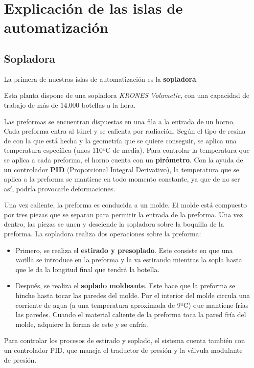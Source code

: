 \documentclass[11pt,a4paper,spanish,twoside]{report}
\begin{document}
\chapter{Explicación de las islas de automatización}
\section{Sopladora}
La primera de nuestras islas de automatización es la \textbf{sopladora}.

Esta planta dispone de una sopladora \emph{KRONES Volumetic}, con una 
capacidad de trabajo de más de 14.000 botellas a la hora.

Las preformas se encuentran dispuestas en una fila a la entrada de un horno. 
Cada preforma entra al túnel y se calienta por radiación. Según el tipo de 
resina de con la que está hecha y la geometría que se quiere conseguir, se 
aplica una temperatura específica (unos 110ºC de media). Para controlar la 
temperatura que se aplica a cada preforma, el horno cuenta con un 
\textbf{pirómetro}. Con la ayuda de un controlador \textbf{PID} (Proporcional
Integral Derivativo), la temperatura que se aplica a la preforma se mantiene
en todo momento constante, ya que de no ser así, podría provocarle
deformaciones.

Una vez caliente, la preforma es conducida a un molde. El molde está compuesto
por tres piezas que se separan para permitir la entrada de la preforma. 
Una vez dentro, las piezas se unen y desciende la sopladora sobre la boquilla 
de la preforma. La sopladora realiza dos operaciones sobre la preforma:
\begin{itemize}
\item Primero, se realiza el \textbf{estirado y presoplado}. Este consiste en
que una varilla se introduce en la preforma y la va estirando mientras la 
sopla hasta que le da la longitud final que tendrá la botella.
\item Después, se realiza el \textbf{soplado moldeante}. Este hace que la 
preforma se hinche hasta tocar las paredes del molde. Por el interior del
molde circula una corriente de agua (a una temperatura aproximada de 9ºC) que
mantiene frías las paredes. Cuando el material caliente de la preforma toca la
pared fría del molde, adquiere la forma de este y se enfría.
\end{itemize}
Para controlar los procesos de estirado y soplado, el sistema cuenta también 
con un controlador PID, que maneja el traductor de presión y la válvula 
modulante de presión.
\end{document}
